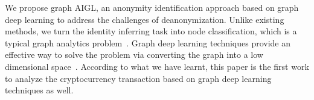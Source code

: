 

We propose graph AIGL, an anonymity identification approach based on graph deep learning to address the challenges of deanonymization.%
Unlike existing methods, we turn the identity inferring task into node classification, which is a typical graph analytics problem~\cite{cai2018comprehensive}. Graph deep learning techniques provide an effective way to solve the problem via converting the graph into a low dimensional space~\cite{hamilton2017representation,battaglia2018relational}. %
According to what we have learnt, this paper is the first work to analyze the cryptocurrency transaction based on graph deep learning techniques as well.

